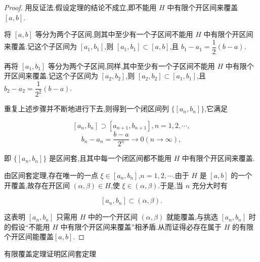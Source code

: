 \begin{proof}
	用反证法.假设定理的结论不成立,即不能用 $H$ 中有限个开区间来覆盖 $[a, b]$.

将 $[a, b]$ 等分为两个子区间,则其中至少有一个子区间不能用 $H$ 中有限个开区间来覆盖.记这个子区间为 $[a_1, b_1]$,则 $[a_1, b_1]\subset[a, b]$,且 $b_1-a_1=\dfrac{1}{2}(b-a)$.

再将 $[a_1, b_1]$ 等分为两个子区间,同样,其中至少有一个子区间不能用 $H$ 中有限个开区间来覆盖.记这个子区间为 $[a_2, b_2]$,则 $[a_2, b_2]\subset[a_1, b_1]$,且 $b_2-a_2=\dfrac{1}{2^2}(b-a)$.

重复上述步骤并不断地进行下去,则得到一个闭区间列 $\{[a_n, b_n]\}$,它满足

$$[a_n, b_n]\supset[a_{n+1}, b_{n+1}], n=1,2,\cdots, $$ $$b_n-a_n=\dfrac{b-a}{2^n}\to0(n\to\infty), $$

即 $\{[a_n, b_n]\}$ 是区间套,且其中每一个闭区间都不能用 $H$ 中有限个开区间来覆盖.

由区间套定理,存在唯一的一点 $\xi\in[a_n, b_n]$,$n=1,2,\cdots$.由于 $H$ 是 $[a, b]$ 的一个开覆盖,故存在开区间 $(\alpha, \beta)\in H$,使 $\xi\in(\alpha, \beta)$.于是,当 $n$ 充分大时有

$$[a_n, b_n]\subset(\alpha, \beta). $$

这表明 $[a_n, b_n]$ 只需用 $H$ 中的一个开区间 $(\alpha, \beta)$ 就能覆盖,与挑选 $[a_n, b_n]$ 时的假设“不能用 $H$ 中有限个开区间来覆盖”相矛盾.从而证得必存在属于 $H$ 的有限个开区间能覆盖$[a, b]$.

\end{proof}


\begin{proposition}
有限覆盖定理证明区间套定理
\end{proposition}

